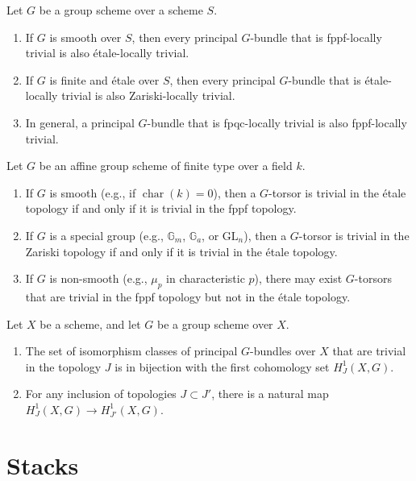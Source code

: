 \documentclass[12pt]{article}
\begin{document}
\begin{proposition}
    Let $G$ be a group scheme over a scheme $S$.
    \begin{enumerate}
        \item If $G$ is smooth over $S$, then every principal $G$-bundle that is fppf-locally trivial is also étale-locally trivial.
        \item If $G$ is finite and étale over $S$, then every principal $G$-bundle that is étale-locally trivial is also Zariski-locally trivial.
        \item In general, a principal $G$-bundle that is fpqc-locally trivial is also fppf-locally trivial.
    \end{enumerate}
\end{proposition}

\begin{theorem}
    Let $G$ be an affine group scheme of finite type over a field $k$.
    \begin{enumerate}
        \item If $G$ is smooth (e.g., if $\operatorname{char}(k) = 0$), then a $G$-torsor is trivial in the étale topology if and only if it is trivial in the fppf topology.
        \item If $G$ is a special group (e.g., $\mathbb{G}_m$, $\mathbb{G}_a$, or $\textrm{GL}_n$), then a $G$-torsor is trivial in the Zariski topology if and only if it is trivial in the étale topology.
        \item If $G$ is non-smooth (e.g., $\mu_p$ in characteristic $p$), there may exist $G$-torsors that are trivial in the fppf topology but not in the étale topology.
    \end{enumerate}
\end{theorem}

\begin{theorem}
    Let $X$ be a scheme, and let $G$ be a group scheme over $X$.
    \begin{enumerate}
        \item The set of isomorphism classes of principal $G$-bundles over $X$ that are trivial in the topology $J$ is in bijection with the first cohomology set $H^1_J(X, G)$.
        \item For any inclusion of topologies $J \subset J'$, there is a natural map $H^1_J(X, G) \to H^1_{J'}(X, G)$.
    \end{enumerate}
\end{theorem}

\section{Stacks}
\end{document}
